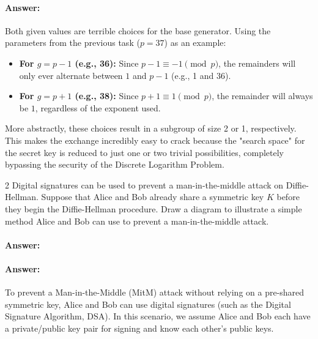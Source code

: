 \documentclass[]{scrartcl}
\newcounter{exercise}
\newcounter{qid}[section]
\newcommand{\exerciseprefix}{prefix}
\newcommand{\questiontitle}{Questions}
\newcommand{\blockid}{B4}
\newcommand{\exname}{}
\begin{document}
\paragraph{Answer:}

Both given values are terrible choices for the base generator. Using the parameters from the previous task ($p = 37$) as an example:

\begin{itemize}
    \item \textbf{For $g = p - 1$ (e.g., 36):} Since $p - 1 \equiv -1 \pmod{p}$, the remainders will only ever alternate between $1$ and $p - 1$ (e.g., 1 and 36). 
    \item \textbf{For $g = p + 1$ (e.g., 38):} Since $p + 1 \equiv 1 \pmod{p}$, the remainder will always be $1$, regardless of the exponent used.
\end{itemize}

More abstractly, these choices result in a subgroup of size 2 or 1, respectively. This makes the exchange incredibly easy to crack because the "search space" for the secret key is reduced to just one or two trivial possibilities, completely bypassing the security of the Discrete Logarithm Problem.

\renewcommand{\exerciseprefix}{PS-\blockid{}-E\theexercise: \exname{}-Q\theqid}
\renewcommand{\questiontitle}{\exerciseprefix{}: Practical computing with DHKE}
\begin{exercisebox}{2}
Digital signatures can be used to prevent a man-in-the-middle attack on Diffie-Hellman. Suppose that Alice and Bob already share a symmetric key $K$ before they begin the Diffie-Hellman procedure. Draw a diagram to illustrate a simple method Alice and Bob can use to prevent a man-in-the-middle attack.
\end{exercisebox}

\paragraph{Answer:} 

\paragraph{Answer:}

To prevent a Man-in-the-Middle (MitM) attack without relying on a pre-shared symmetric key, Alice and Bob can use digital signatures (such as the Digital Signature Algorithm, DSA). In this scenario, we assume Alice and Bob each have a private/public key pair for signing and know each other's public keys.
\end{document}
